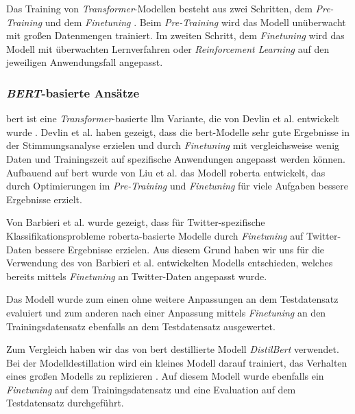 Das Training von \textit{Transformer}-Modellen besteht aus zwei Schritten, dem \textit{Pre-Training} und dem \textit{Finetuning} \cite{Radford2018ImprovingLU}.
Beim \textit{Pre-Training} wird das Modell unüberwacht mit großen Datenmengen trainiert.
Im zweiten Schritt, dem \textit{Finetuning} wird das Modell mit überwachten Lernverfahren oder \textit{Reinforcement Learning} \cite{deepseekai2025deepseekr1incentivizingreasoningcapability, devlin2018bert} auf den jeweiligen Anwendungsfall angepasst.


\subsubsection{\textit{BERT}-basierte Ansätze}\label{subsec:bert}

\gls{bert} ist eine \textit{Transformer}-basierte \gls{llm} Variante, die von Devlin et al. entwickelt wurde \cite{devlin2018bert}.
Devlin et al. haben gezeigt, dass die \gls{bert}-Modelle sehr gute Ergebnisse in der Stimmungsanalyse erzielen und durch \textit{Finetuning} mit vergleichsweise wenig Daten und Trainingszeit auf spezifische Anwendungen angepasst werden können.
Aufbauend auf \gls{bert} wurde von Liu et al. \cite{liu2019roberta} das Modell \gls{roberta} entwickelt, das durch Optimierungen im \textit{Pre-Training} und \textit{Finetuning} für viele Aufgaben bessere Ergebnisse erzielt.

Von Barbieri et al. \cite{barbieri2020tweeteval} wurde gezeigt, dass für Twitter-spezifische Klassifikationsprobleme \gls{roberta}-basierte Modelle durch \textit{Finetuning} auf Twitter-Daten bessere Ergebnisse erzielen.
Aus diesem Grund haben wir uns für die Verwendung des von Barbieri et al. entwickelten Modells entschieden, welches bereits mittels \textit{Finetuning} an Twitter-Daten angepasst wurde.

Das Modell wurde zum einen ohne weitere Anpassungen an dem Testdatensatz evaluiert und zum anderen nach einer Anpassung mittels \textit{Finetuning} an den Trainingsdatensatz ebenfalls an dem Testdatensatz ausgewertet.

Zum Vergleich haben wir das von \gls{bert} destillierte Modell \textit{DistilBert} \cite{sanh2019distilbert} verwendet.
Bei der Modelldestillation wird ein kleines Modell darauf trainiert, das Verhalten eines großen Modells zu replizieren \cite{sanh2019distilbert}.
Auf diesem Modell wurde ebenfalls ein \textit{Finetuning} auf dem Trainingsdatensatz und eine Evaluation auf dem Testdatensatz durchgeführt.


